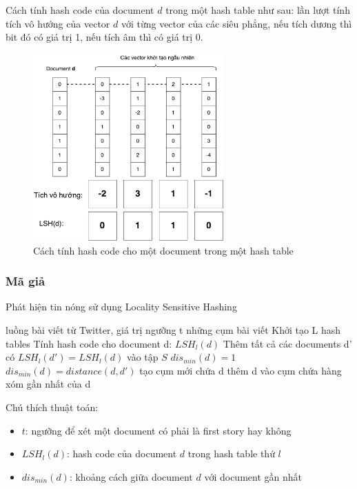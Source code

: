 	Cách tính hash code của document $d$ trong một hash table như sau: lần lượt tính tích vô hướng của vector $d$ với từng vector của các siêu phẳng, nếu tích dương thì bit đó có giá trị 1, nếu tích âm thì có giá trị 0. 
	
	\begin{figure}[ht]
		\begin{center}
			\includegraphics[width=0.65\textwidth]{LSH.pdf}
			\caption{Cách tính hash code cho một document trong một hash table}
		\end{center}
	\end{figure}
	
	\subsubsection{Mã giả}
	\begin{algorithm}[H]
		\caption{Phát hiện tin nóng sử dụng Locality Sensitive Hashing}
		\begin{algorithmic}[1]
			\REQUIRE luồng bài viết từ Twitter, giá trị ngưỡng t
			\ENSURE những cụm bài viết
			\State Khởi tạo L hash tables
					\State Tính hash code cho document d: $LSH_l(d)$
					\State Thêm tất cả các documents d' có $LSH_l(d') = LSH_l(d)$ vào tập $S$
				\ENDFOR
				\State $dis_{min}(d) = 1$
					\STATE $dis_{min}(d) = distance(d,d')$
		 			\ENDIF
				\ENDFOR
					\STATE tạo cụm mới chứa d
				\ELSE
					\STATE thêm d vào cụm chứa hàng xóm gần nhất của d
				\ENDIF
			\ENDFOR
			
		\end{algorithmic}
	\end{algorithm}
	Chú thích thuật toán:
	\begin{itemize}
		\item $t$: ngưỡng để xét một document có phải là first story hay không
		\item $LSH_l(d)$: hash code của document $d$ trong hash table thứ $l$
		\item $dis_{min}(d)$: khoảng cách giữa document $d$ với document gần nhất
		
	\end{itemize}
	

